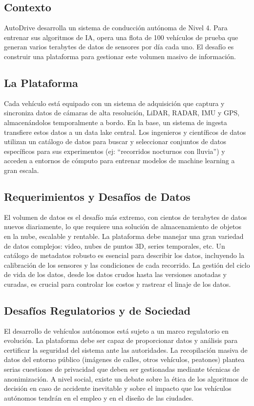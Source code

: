 \documentclass[12pt]{article}
\begin{document}
\subsection{Contexto}
AutoDrive desarrolla un sistema de conducción autónoma de Nivel 4. Para entrenar sus algoritmos de IA, opera una flota de 100 vehículos de prueba que generan varios terabytes de datos de sensores por día cada uno. El desafío es construir una plataforma para gestionar este volumen masivo de información.

\subsection{La Plataforma}
Cada vehículo está equipado con un sistema de adquisición que captura y sincroniza datos de cámaras de alta resolución, LiDAR, RADAR, IMU y GPS, almacenándolos temporalmente a bordo. En la base, un sistema de ingesta transfiere estos datos a un data lake central. Los ingenieros y científicos de datos utilizan un catálogo de datos para buscar y seleccionar conjuntos de datos específicos para sus experimentos (ej: ``recorridos nocturnos con lluvia'') y acceden a entornos de cómputo para entrenar modelos de machine learning a gran escala.

\subsection{Requerimientos y Desafíos de Datos}
El volumen de datos es el desafío más extremo, con cientos de terabytes de datos nuevos diariamente, lo que requiere una solución de almacenamiento de objetos en la nube, escalable y rentable. La plataforma debe manejar una gran variedad de datos complejos: video, nubes de puntos 3D, series temporales, etc. Un catálogo de metadatos robusto es esencial para describir los datos, incluyendo la calibración de los sensores y las condiciones de cada recorrido. La gestión del ciclo de vida de los datos, desde los datos crudos hasta las versiones anotadas y curadas, es crucial para controlar los costos y rastrear el linaje de los datos.

\subsection{Desafíos Regulatorios y de Sociedad}
El desarrollo de vehículos autónomos está sujeto a un marco regulatorio en evolución. La plataforma debe ser capaz de proporcionar datos y análisis para certificar la seguridad del sistema ante las autoridades. La recopilación masiva de datos del entorno público (imágenes de calles, otros vehículos, peatones) plantea serias cuestiones de privacidad que deben ser gestionadas mediante técnicas de anonimización. A nivel social, existe un debate sobre la ética de los algoritmos de decisión en caso de accidente inevitable y sobre el impacto que los vehículos autónomos tendrán en el empleo y en el diseño de las ciudades.
\end{document}
